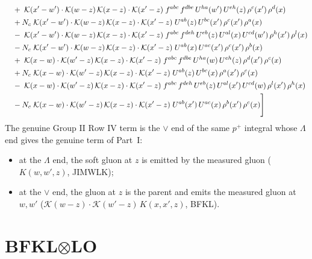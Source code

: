 \documentclass[10pt]{article}
\numberwithin{equation}{section}
\newcommand{\KK}{\mathcal K}
\begin{document}
\begin{align}
&\quad +\;\mathcal{K}(x'-w')\cdot\mathcal{K}(w-z)\,\mathcal{K}(x-z)\cdot\mathcal{K}(x'-z)\;f^{abc}\,f^{dbe}\,U^{ha}(w')\,U^{eh}(z)\,\rho^{c}(x')\,\rho^{d}(x)\notag\\
&\quad +N_c\;\mathcal{K}(x'-w')\cdot\mathcal{K}(w-z)\,\mathcal{K}(x-z)\cdot\mathcal{K}(x'-z)\;U^{ab}(z)\,U^{bc}(x')\,\rho^{c}(x')\,\rho^{a}(x)\notag\\
&\quad -\;\mathcal{K}(x'-w')\cdot\mathcal{K}(w-z)\,\mathcal{K}(x-z)\cdot\mathcal{K}(x'-z)\;f^{abc}\,f^{deh}\,U^{eb}(z)\,U^{al}(x)\,U^{cd}(w')\,\rho^{h}(x')\,\rho^{l}(x)\notag\\
&\quad -N_c\;\mathcal{K}(x'-w')\cdot\mathcal{K}(w-z)\,\mathcal{K}(x-z)\cdot\mathcal{K}(x'-z)\;U^{ab}(x)\,U^{ac}(x')\,\rho^{c}(x')\,\rho^{b}(x)\notag\\
&\quad +\;\mathcal{K}(x-w)\cdot\mathcal{K}(w'-z)\,\mathcal{K}(x-z)\cdot\mathcal{K}(x'-z)\;f^{abc}\,f^{dbe}\,U^{ha}(w)\,U^{eh}(z)\,\rho^{d}(x')\,\rho^{c}(x)\notag\\
&\quad +N_c\;\mathcal{K}(x-w)\cdot\mathcal{K}(w'-z)\,\mathcal{K}(x-z)\cdot\mathcal{K}(x'-z)\;U^{ab}(z)\,U^{bc}(x)\,\rho^{a}(x')\,\rho^{c}(x)\notag\\
&\quad -\;\mathcal{K}(x-w)\cdot\mathcal{K}(w'-z)\,\mathcal{K}(x-z)\cdot\mathcal{K}(x'-z)\;f^{abc}\,f^{deh}\,U^{eb}(z)\,U^{al}(x')\,U^{cd}(w)\,\rho^{l}(x')\,\rho^{h}(x)\notag\\
&\quad -N_c\;\mathcal{K}(x-w)\cdot\mathcal{K}(w'-z)\,\mathcal{K}(x-z)\cdot\mathcal{K}(x'-z)\;U^{ab}(x')\,U^{ac}(x)\,\rho^{b}(x')\,\rho^{c}(x)\Bigg]\label{eq:Plist}
\end{align}
The genuine Group II Row IV term is the $\vee$ end of the same $p^+$ integral whose $\Lambda$ end gives the genuine term of Part~I:
\begin{itemize}
\item at the $\Lambda$ end, the soft gluon at $z$ is emitted by the measured gluon ($K(w,w',z)$, JIMWLK);
\item at the $\vee$ end, the gluon at $z$ is the parent and emits the measured gluon at $w,w'$ ($\KK(w-z)\cdot\KK(w'-z)\,K(x,x',z)$, BFKL).
\end{itemize}

\section{BFKL\texorpdfstring{$\otimes$}{x}LO}\label{sec:B}
\end{document}
